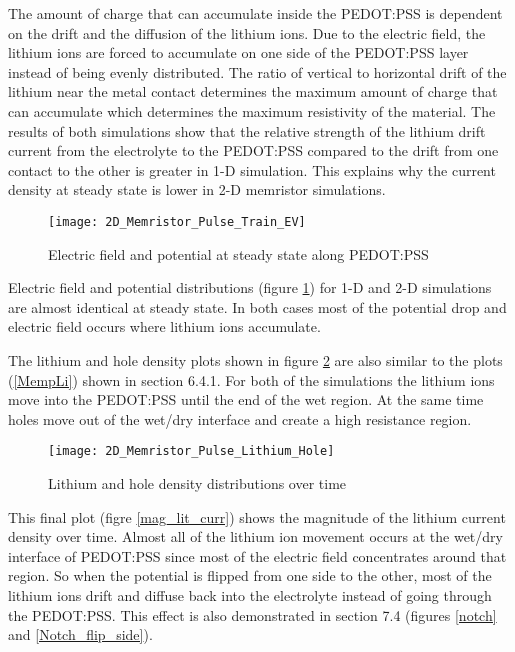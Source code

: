 \begin{doublespace}
The amount of charge that can accumulate inside the PEDOT:PSS is dependent on the drift and the diffusion of the lithium ions. Due to the electric field, the lithium ions are forced to accumulate on one side of the PEDOT:PSS layer instead of being evenly distributed. The ratio of vertical to horizontal drift of the lithium near the metal contact determines the maximum amount of charge that can accumulate which determines the maximum resistivity of the material. The results of both simulations show that the relative strength of the lithium drift current from the electrolyte to the PEDOT:PSS compared to the drift from one contact to the other is greater in 1-D simulation. This explains why the current density at steady state is lower in 2-D memristor simulations. 

\begin{figure}[!htp]
\centering
\texttt{[image: 2D\_Memristor\_Pulse\_Train\_EV]}
\caption{Electric field and potential at steady state along PEDOT:PSS} 
\label{2D_E_V_ss}
\end{figure}

Electric field and potential distributions (figure \ref{2D_E_V_ss}) for 1-D and 2-D simulations are almost identical at steady state. In both cases most of the potential drop and electric field occurs where lithium ions accumulate.

The lithium and hole density plots shown in figure \ref{lit_hole_dist} are also similar to the plots (\ref{MempLi}) shown in section 6.4.1. For both of the simulations the lithium ions move into the PEDOT:PSS until the end of the wet region. At the same time holes move out of the wet/dry interface and create a high resistance region.

\begin{figure}[!htp]
\centering
\texttt{[image: 2D\_Memristor\_Pulse\_Lithium\_Hole]}
\caption{Lithium and hole density distributions over time} 
\label{lit_hole_dist}
\end{figure}


This final plot (figre \ref{mag_lit_curr}) shows the magnitude of the lithium current density over time. Almost all of the lithium ion movement occurs at the wet/dry interface of PEDOT:PSS since most of the electric field concentrates around that region. So when the potential is flipped from one side to the other, most of the lithium ions drift and diffuse back into the electrolyte instead of going through the PEDOT:PSS. This effect is also demonstrated in section 7.4 (figures \ref{notch} and \ref{Notch_flip_side}). 


\end{doublespace}
